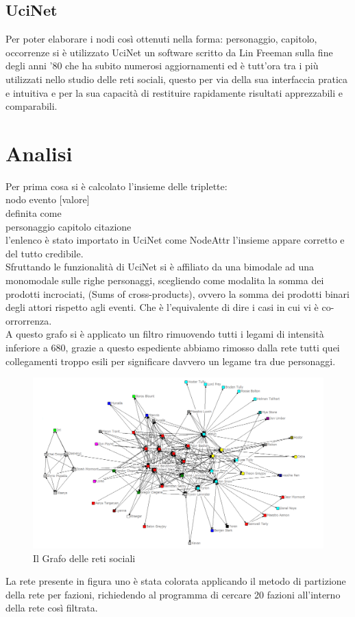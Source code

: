 \documentclass[a4paper]{article}
\begin{document}
\subsection{UciNet}
Per poter elaborare i nodi così ottenuti nella forma: personaggio, capitolo, occorrenze si è utilizzato UciNet\cite{UciNet} un software scritto da Lin Freeman sulla fine degli anni '80 che ha subito numerosi aggiornamenti ed è tutt'ora tra i più utilizzati nello studio delle reti sociali, questo per via della sua interfaccia pratica e intuitiva e per la sua capacità di restituire rapidamente risultati apprezzabili e comparabili.

\section{Analisi}
Per prima cosa si è calcolato l'insieme delle triplette:\\
nodo evento [valore]\\
definita come\\
personaggio capitolo citazione\\
l'enlenco è stato importato in UciNet come NodeAttr l'insieme appare corretto e del tutto credibile.\\
Sfruttando le funzionalità di UciNet si è affiliato da una bimodale ad una monomodale sulle righe personaggi, scegliendo come modalita la somma dei prodotti incrociati, (Sums of cross-products), ovvero la somma dei prodotti binari degli attori rispetto agli eventi. Che è l'equivalente di dire i casi in cui vi è co-orrorrenza.\\
A questo grafo si è applicato un filtro rimuovendo tutti i legami di intensità inferiore a 680, grazie a questo espediente abbiamo rimosso dalla rete tutti quei collegamenti troppo esili per significare davvero un legame tra due personaggi. 
\begin{figure}[h]
\centering
\includegraphics[width=.9\textwidth]{picture/029.png}
\caption{Il Grafo delle reti sociali}
\label{fig:grafo-partito}
\end{figure}
La rete presente in figura uno è stata colorata applicando il metodo di partizione della rete per fazioni, richiedendo al programma di cercare 20 fazioni all'interno della rete così filtrata.\\
\end{document}
